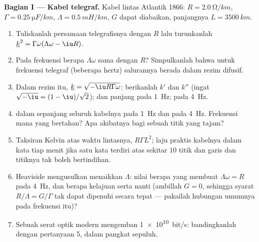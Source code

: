 \begin{problem}
\label{pb:b2:dispersion-wave-packets:1}

\medskip
\noindent\textbf{Bagian I --- Kabel telegraf.}
Kabel lintas Atlantik 1866: $R = \qty{2.0}{\ohm/km}$, $\Gamma = \qty{0.25}{\micro F/km}$,
$\Lambda = \qty{0.5}{mH/km}$, $G$ dapat diabaikan, panjangnya $L = \qty{3500}{km}$.
\begin{enumerate}
  \item Tuliskanlah persamaan telegrafisnya dengan $R$ lalu turunkanlah
         $\underline k^2 = \Gamma\omega(\Lambda\omega - \iu R)$.
  \item Pada frekuensi berapa $\Lambda\omega$ sama dengan $R$? Simpulkanlah bahwa untuk
        frekuensi telegraf (beberapa hertz) salurannya berada dalam
        rezim difusif.
  \item Dalam rezim itu, $\underline k = \sqrt{-\iu R\Gamma\omega}$: berikanlah $k'$ dan $k''$
        (ingat $\sqrt{-\iu} = (1 - \iu)/\sqrt2$);  dan
        panjang  pada \qty{1}{Hz}; pada \qty{4}{Hz}.
  \item {} dalam  sepanjang seluruh kabelnya pada \qty{1}{Hz} dan
        pada \qty{4}{Hz}. Frekuensi mana yang bertahan? Apa akibatnya bagi sebuah
        titik yang tajam?
  \item Taksiran Kelvin atas waktu lintasnya, $R\Gamma L^2$; laju praktis
        kabelnya dalam kata tiap menit jika satu kata terdiri atas sekitar
        $10$ titik dan garis dan titiknya tak boleh bertindihan.
  \item Heaviside mengusulkan menaikkan $\Lambda$: nilai berapa yang membuat $\Lambda\omega = R$
        pada \qty{4}{Hz}, dan berapa kelajuan serta  nanti
        (ambillah $G = 0$, sehingga syarat $R/\Lambda = G/\Gamma$ tak dapat dipenuhi
        secara tepat --- pakailah hubungan umumnya pada frekuensi itu)?
  \item Sebuah serat optik modern mengemban \qty{1e10}{bit/s}: bandingkanlah dengan
        pertanyaan 5, dalam pangkat sepuluh.
\end{enumerate}


\end{problem}
